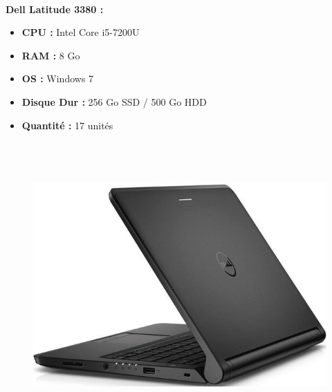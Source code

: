 \documentclass[11pt,a4paper,twoside]{article}
\begin{document}
\paragraph{}\textbf{Dell Latitude 3380 :} \\
\begin{itemize}
\item \textbf{CPU :} Intel Core i5-7200U
\item \textbf{RAM :} 8 Go
\item \textbf{OS :} Windows 7
\item \textbf{Disque Dur :} 256 Go SSD / 500 Go HDD
\item \textbf{Quantité :} 17 unités
\\ \\ \\ \\
\end{itemize}
\begin{figure}
\includegraphics[scale=0.4]{Ressources/Materiel/L3350.jpg}\vspace{-2cm}
\end{figure}
\end{document}
